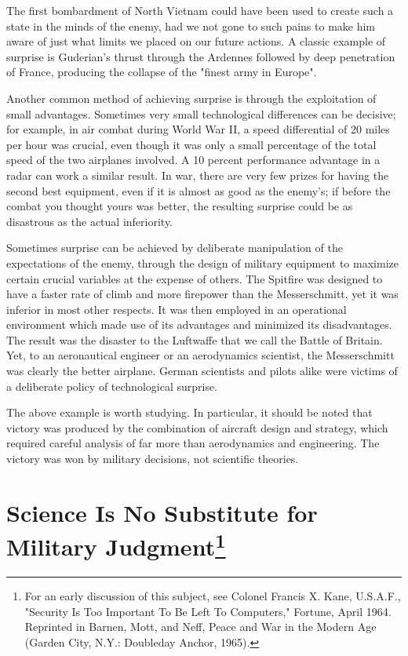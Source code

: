 The first bombardment of North Vietnam could have been used to create such a state in the minds of the enemy, had we not gone to such pains to make him aware of just what limits we placed on our future actions. A classic example of surprise is Guderian's thrust through the Ardennes followed by deep penetration of France, producing the collapse of the "finest army in Europe".

Another common method of achieving surprise is through the exploitation of small advantages. Sometimes very small technological differences can be decisive; for example, in air combat during World War II, a speed differential of 20 miles per hour was crucial, even though it was only a small percentage of the total speed of the two airplanes involved. A 10 percent performance advantage in a radar can work a similar result. In war, there are very few prizes for having the second best equipment, even if it is almost as good as the enemy's; if before the combat you thought yours was better, the resulting surprise could be as disastrous as the actual inferiority.

Sometimes surprise can be achieved by deliberate manipulation of the expectations of the enemy, through the design of military equipment to maximize certain crucial variables at the expense of others. The Spitfire was designed to have a faster rate of climb and more firepower than the Messerschmitt, yet it was inferior in most other respects. It was then employed in an operational environment which made use of its advantages and minimized its disadvantages. The result was the disaster to the Luftwaffe that we call the Battle of Britain. Yet, to an aeronautical engineer or an aerodynamics scientist, the Messerschmitt was clearly the better airplane. German scientists and pilots alike were victims of a deliberate policy of technological surprise.

The above example is worth studying. In particular, it should be noted that victory was produced by the combination of aircraft design and strategy, which required careful analysis of far more than aerodynamics and engineering. The victory was won by military decisions, not scientific theories.

\section{Science Is No Substitute for Military Judgment\footnote{
    For an early discussion of this subject, see Colonel Francis X. Kane, U.S.A.F., "Security Is Too Important To Be Left To Computers," Fortune, April 1964. Reprinted in Barnen, Mott, and Neff, Peace and War in the Modern Age (Garden City, N.Y.: Doubleday Anchor, 1965).}
}

